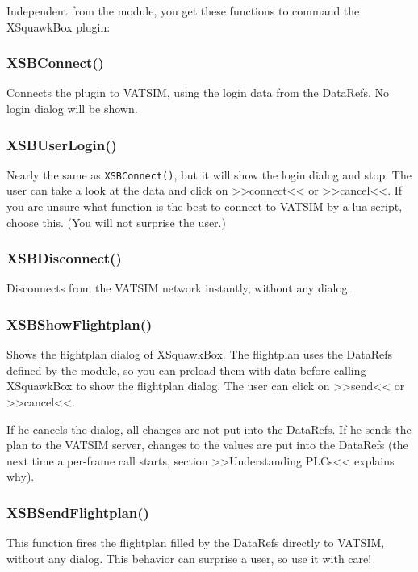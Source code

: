 \documentclass[11pt,parskip=half,a4paper]{scrartcl}
\begin{document}
Independent from the module, you get these functions to command the XSquawkBox plugin:

\subsubsection{XSBConnect()}

Connects the plugin to VATSIM, using the login data from the DataRefs. No login dialog will be shown.

\subsubsection{XSBUserLogin()}

Nearly the same as \verb|XSBConnect()|, but it will show the login dialog and stop. The user can take a look at the data and click on >>connect<< or >>cancel<<. If you are unsure what function is the best to connect to VATSIM by a lua script, choose this. (You will not surprise the user.)

\subsubsection{XSBDisconnect()}

Disconnects from the VATSIM network instantly, without any dialog.

\subsubsection{XSBShowFlightplan()}

Shows the flightplan dialog of XSquawkBox. The flightplan uses the DataRefs defined by the module, so you can preload them with data before calling XSquawkBox to show the flightplan dialog. The user can click on >>send<< or >>cancel<<.

If he cancels the dialog, all changes are not put into the DataRefs. If he sends the plan to the VATSIM server, changes to the values are put into the DataRefs (the next time a per-frame call starts, section >>Understanding PLCs<< explains why).

\subsubsection{XSBSendFlightplan()}

This function fires the flightplan filled by the DataRefs directly to VATSIM, without any dialog. This behavior can surprise a user, so use it with care!
\end{document}
